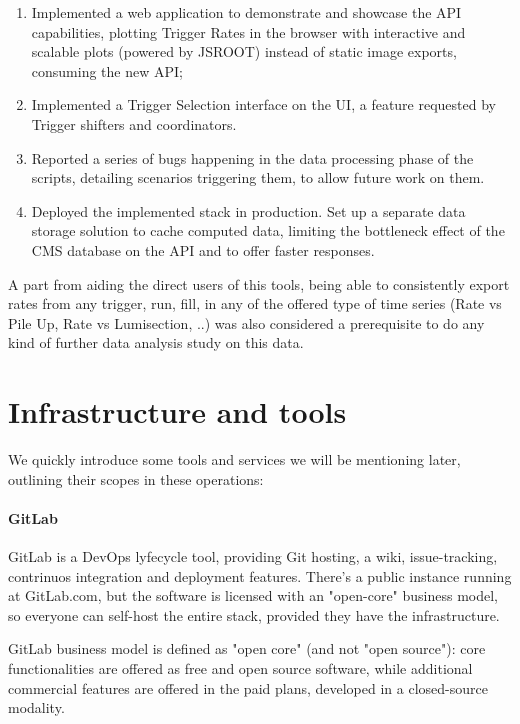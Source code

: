 \begin{enumerate}
\item Implemented a web application to demonstrate and showcase the API capabilities, plotting Trigger Rates in the browser with interactive and scalable plots (powered by JSROOT) instead of static image exports, consuming the new API;
\item Implemented a Trigger Selection interface on the UI, a feature requested by Trigger shifters and coordinators.
\item Reported a series of bugs happening in the data processing phase of the scripts, detailing scenarios triggering them, to allow future work on them.
\item Deployed the implemented stack in production. Set up a separate data storage solution to cache computed data, limiting the bottleneck effect of the CMS database on the API and to offer faster responses.

\end{enumerate}

A part from aiding the direct users of this tools, being able to consistently export rates from any trigger, run, fill, in any of the offered type of time series (Rate vs Pile Up, Rate vs Lumisection, ..) was also considered a prerequisite to do any kind of further data analysis study on this data.

\section{Infrastructure and tools}

We quickly introduce some tools and services we will be mentioning later, outlining their scopes in these operations:

\paragraph{GitLab}

GitLab is a DevOps lyfecycle tool, providing Git hosting, a wiki, issue-tracking, contrinuos integration and deployment features. There's a public instance running at GitLab.com, but the software is licensed with an "open-core" business model, so everyone can self-host the entire stack, provided they have the infrastructure.

GitLab business model is defined as "open core" (and not "open source"): core functionalities are offered as free and open source software, while additional commercial features are offered in the paid plans, developed in a closed-source modality.

